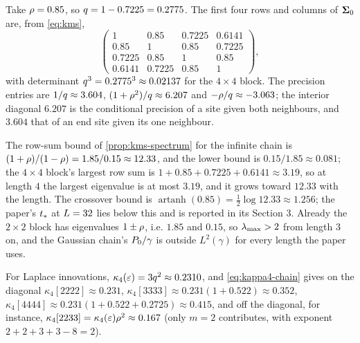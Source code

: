 Take $\rho=0.85$, so $q=1-0.7225=0.2775$. The first four rows and columns of
$\mathbf{\Sigma}_0$ are, from \cref{eq:kms},
\[
  \begin{pmatrix}1&0.85&0.7225&0.6141\\0.85&1&0.85&0.7225\\0.7225&0.85&1&0.85\\0.6141&0.7225&0.85&1\end{pmatrix},
\]
with determinant $q^3=0.2775^3\approx0.02137$ for the $4\times4$ block. The precision
entries are $1/q\approx3.604$, $(1+\rho^2)/q\approx6.207$ and $-\rho/q\approx-3.063$;
the interior diagonal $6.207$ is the conditional precision of a site given both
neighbours, and $3.604$ that of an end site given its one neighbour.

The row-sum bound of \cref{prop:kms-spectrum} for the infinite chain is
$(1+\rho)/(1-\rho)=1.85/0.15\approx12.33$, and the lower bound is
$0.15/1.85\approx0.081$; the $4\times4$ block's largest row sum is
$1+0.85+0.7225+0.6141\approx3.19$, so at length $4$ the largest eigenvalue is at most
$3.19$, and it grows toward $12.33$ with the length. The crossover bound is
$\operatorname{artanh}(0.85)=\tfrac12\log12.33\approx1.256$; the paper's $t_{*}$ at
$L=32$ lies below this and is reported in its Section 3. Already the $2\times2$
block has eigenvalues $1\pm\rho$, i.e. $1.85$ and $0.15$, so $\lambda_{\max}>2$ from length $3$
on, and the Gaussian chain's $P_0/\gamma$ is outside $L^2(\gamma)$ for every length the
paper uses.

For Laplace innovations, $\kappa_4(\varepsilon)=3q^2\approx0.2310$, and
\cref{eq:kappa4-chain} gives on the diagonal $\kappa_4[2222]\approx0.231$,
$\kappa_4[3333]\approx0.231(1+0.522)\approx0.352$, $\kappa_4[4444]\approx0.231(1+0.522+0.2725)\approx0.415$,
and off the diagonal, for instance, $\kappa_4[2233]=\kappa_4(\varepsilon)\rho^{2}\approx0.167$
(only $m=2$ contributes, with exponent $2+2+3+3-8=2$).


